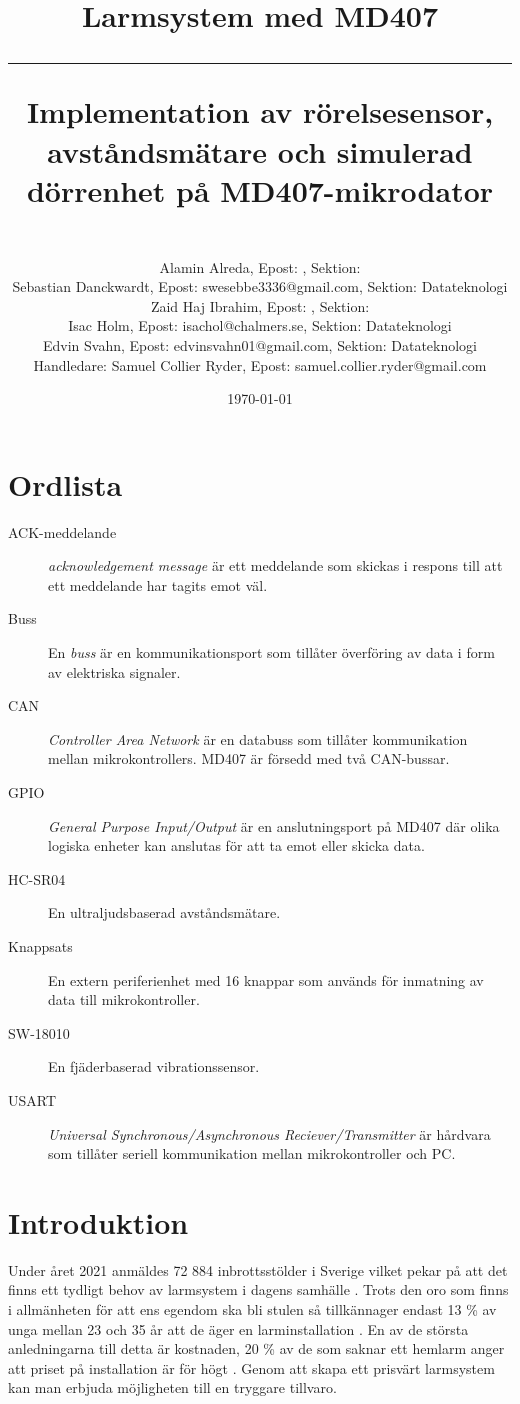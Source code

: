 \documentclass{article}
\title{\textbf{Larmsystem med MD407}\\ 
\hspace{10cm}
\hrule
\hspace{10cm}
Implementation av rörelsesensor, avståndsmätare och simulerad dörrenhet på MD407-mikrodator}
\author{\\Alamin Alreda, Epost: , Sektion: \\Sebastian Danckwardt, Epost: swesebbe3336@gmail.com, Sektion: Datateknologi\\Zaid Haj Ibrahim, Epost: , Sektion: \\Isac Holm, Epost: isachol@chalmers.se, Sektion: Datateknologi\\Edvin Svahn, Epost: edvinsvahn01@gmail.com, Sektion: Datateknologi\\Handledare: Samuel Collier Ryder, Epost: samuel.collier.ryder@gmail.com}
\date{\today}
\begin{document}
\maketitle
\newpage
\tableofcontents
\newpage
\section*{Ordlista}
\begin{description}

\item[ACK-meddelande] \emph{acknowledgement message} är ett meddelande som skickas i respons till att ett meddelande har tagits emot väl.

\item[Buss] En \emph{buss} är en kommunikationsport som tillåter överföring av data i form av elektriska signaler.

\item[CAN] \emph{Controller Area Network} är en databuss som tillåter kommunikation mellan mikrokontrollers. MD407 är försedd med två CAN-bussar.

\item[GPIO] \emph{General Purpose Input/Output} är en anslutningsport på MD407 där olika logiska enheter kan anslutas för att ta emot eller skicka data.

\item[HC-SR04] En ultraljudsbaserad avståndsmätare.

\item[Knappsats] En extern periferienhet med 16 knappar som används för inmatning av data till mikrokontroller.

\item[SW-18010] En fjäderbaserad vibrationssensor.

\item[USART] \emph{Universal Synchronous/Asynchronous Reciever/Transmitter} är hårdvara som tillåter seriell kommunikation mellan mikrokontroller och PC.

\end{description}
 \newpage

\setcounter{page}{1}
\section{Introduktion}

Under året 2021 anmäldes 72 884 inbrottsstölder i Sverige vilket pekar på att det finns ett tydligt behov av larmsystem i dagens samhälle \cite{BRa}.
Trots den oro som finns i allmänheten för att ens egendom ska bli stulen så tillkännager endast 13 \% av unga mellan 23 och 35 år att de äger en larminstallation \cite{MoFor}.
En av de största anledningarna till detta är kostnaden, 20 \% av de som saknar ett hemlarm anger att priset på installation är för högt \cite{MoFor}.
Genom att skapa ett prisvärt larmsystem kan man erbjuda möjligheten till en tryggare tillvaro.
\end{document}
